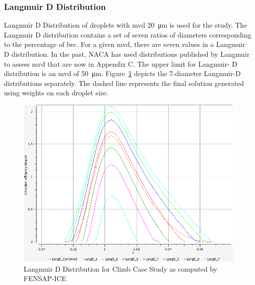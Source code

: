 \documentclass[english]{kththesis}
\begin{document}
\subsubsection{Langmuir D Distribution}
Langmuir D Distribution of droplets with \acrshort{mvd} \SI{20}{\micro\metre} is used for the study. The Langmuir D distribution contains a set of seven ratios of diameters corresponding to the percentage of \acrshort{lwc}. For a given \acrshort{mvd}, there are seven values in a Langmuir D distribution. In the past, NACA has used distributions published by Langmuir to assess \acrshort{mvd} that are now in Appendix C. The upper limit for Langmuir- D distribution is an \acrshort{mvd} of \SI{50}{\micro\metre}. Figure~\ref{fig:LangmuirD} depicts the 7-diameter Langmuir-D distributions separately. The dashed line represents the final solution generated using weights on each droplet size.

\begin{figure}[!ht]
    \centering
\graphicspath{ {IPS/} }
\includegraphics[width=1\textwidth,height=\textheight,keepaspectratio]{Collection_Efficiency_LangD}
\caption{Langmuir D Distribution for Climb Case Study as computed by FENSAP-ICE \cite{Habashi2004}}
\label{fig:LangmuirD}
\end{figure}

\end{document}
